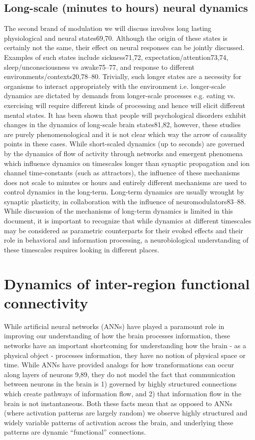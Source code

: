 \begin{refsection}
\subsection{Long-scale (minutes to hours) neural dynamics}
The second brand of modulation we will discuss involves long lasting physiological and neural states69,70. Although the origin of these states is certainly not the same, their effect on neural responses can be jointly discussed. Examples of such states include sickness71,72, expectation/attention73,74, sleep/unconsciousness vs awake75–77, and response to different environments/contexts20,78–80.
Trivially, such longer states are a necessity for organisms to interact appropriately with the environment i.e. longer-scale dynamics are dictated by demands from longer-scale processes e.g. eating vs. exercising will require different kinds of processing and hence will elicit different mental states. It has been shown that people will psychological disorders exhibit changes in the dynamics of long-scale brain states81,82, however, these studies are purely phenomenological and it is not clear which way the arrow of causality points in these cases.
While short-scaled dynamics (up to seconds) are governed by the dynamics of flow of activity through networks and emergent phenomena which influence dynamics on timescales longer than synaptic propagation and ion channel time-constants (such as attractors), the influence of these mechanisms does not scale to minutes or hours and entirely different mechanisms are used to control dynamics in the long-term. Long-term dynamics are usually wrought by synaptic plasticity, in collaboration with the influence of neuromodulators83–88. While discussion of the mechanisms of long-term dynamics is limited in this document, it is important to recognize that while dynamics at different timescales may be considered as parametric counterparts for their evoked effects and their role in behavioral and information processing, a neurobiological understanding of these timescales requires looking in different places.

\section{Dynamics of inter-region functional connectivity}
While artificial neural networks (ANNs) have played a paramount role in improving our understanding of how the brain processes information, these networks have an important shortcoming for understanding how the brain - as a physical object - processes information, they have no notion of physical space or time. While ANNs have provided analogs for how transformations can occur along layers of neurons 9,89, they do not model the fact that communication between neurons in the brain is 1) governed by highly structured connections which create pathways of information flow, and 2) that information flow in the brain is not instantaneous. Both these facts mean that as opposed to ANNs (where activation patterns are largely random) we observe highly structured and widely variable patterns of activation across the brain, and underlying these patterns are dynamic “functional” connections. 


\end{refsection}

